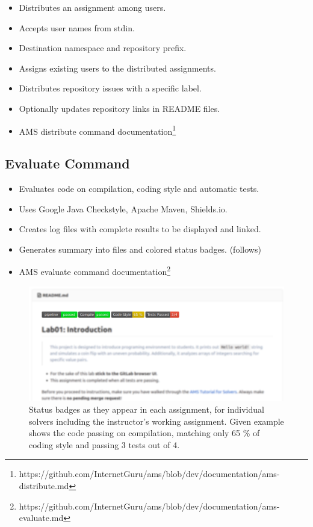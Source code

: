 \begin{itemize}
\item
  {Distributes an assignment among users.}
\item
  {Accepts user names from stdin.}
\item
  {Destination namespace and repository prefix.}
\item
  {Assigns existing users to the distributed assignments.}
\item
  {Distributes repository issues with a specific label.}
\item
  {Optionally updates repository links in README files.}
\item
  {AMS distribute command documentation\footnote{https://github.com/InternetGuru/ams/blob/dev/documentation/ams-distribute.md}}
\end{itemize}

\subsection{Evaluate Command}\label{ssec:evalcmd}

\begin{itemize}
\item
  {Evaluates code on compilation, coding style and automatic tests.}
\item
  {Uses Google Java Checkstyle, Apache Maven, Shields.io.}
\item
  {Creates log files with complete results to be displayed and linked.}
\item
  {Generates summary into files and colored status badges. (follows)}
\item
  {AMS evaluate command documentation\footnote{https://github.com/InternetGuru/ams/blob/dev/documentation/ams-evaluate.md}}
\end{itemize}

\begin{figure}[H]
    \centering
    \includegraphics[width=\textwidth,height=\textheight,keepaspectratio]{Figures/impl/image1.png}
    \caption[Status badges example]{Status badges as they appear in each assignment, for individual solvers including the instructor's working assignment. Given example shows the code passing on compilation, matching only 65 \% of coding style and passing 3 tests out of 4.}
\end{figure}

